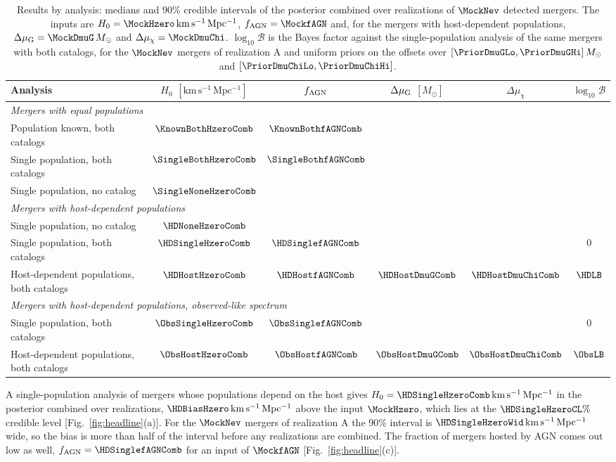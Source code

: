 \documentclass[aps,prd,reprint,superscriptaddress,nofootinbib,nolongbibliography,floatfix]{revtex4-2}
\newcommand{\kms}{\,\mathrm{km\,s^{-1}\,Mpc^{-1}}}
\newcommand{\Msun}{M_\odot}
\newcommand{\fagn}{f_{\rm AGN}}
\newcommand{\dmug}{\Delta\mu_{\rm G}}
\newcommand{\dmuchi}{\Delta\mu_{\chi}}
\newcommand{\lB}{\log_{10}\mathcal{B}}
\begin{document}
\begin{table}
\caption{Results by analysis: medians and 90\% credible intervals of the posterior combined over realizations of $\MockNev$ detected mergers.
The inputs are $H_0=\MockHzero\kms$, $\fagn=\MockfAGN$ and, for the mergers with host-dependent populations, $\dmug=\MockDmuG\,\Msun$ and $\dmuchi=\MockDmuChi$.
$\lB$ is the Bayes factor against the single-population analysis of the same mergers with both catalogs, for the $\MockNev$ mergers of realization A and uniform priors on the offsets over $[\PriorDmuGLo,\PriorDmuGHi]\,\Msun$ and $[\PriorDmuChiLo,\PriorDmuChiHi]$.}
\label{tab:results}
\begin{ruledtabular}
\begin{tabular}{lccccc}
Analysis & $H_0$ $[\mathrm{km\,s^{-1}\,Mpc^{-1}}]$ & $\fagn$ & $\dmug$ $[\Msun]$ & $\dmuchi$ & $\lB$\\
\hline
\multicolumn{6}{l}{\textit{Mergers with equal populations}}\\
Population known, both catalogs & $\KnownBothHzeroComb$ & $\KnownBothfAGNComb$ & & & \\
Single population, both catalogs & $\SingleBothHzeroComb$ & $\SingleBothfAGNComb$ & & & \\
Single population, no catalog & $\SingleNoneHzeroComb$ & & & & \\
\multicolumn{6}{l}{\textit{Mergers with host-dependent populations}}\\
Single population, no catalog & $\HDNoneHzeroComb$ & & & & \\
Single population, both catalogs & $\HDSingleHzeroComb$ & $\HDSinglefAGNComb$ & & & 0\\
Host-dependent populations, both catalogs & $\HDHostHzeroComb$ & $\HDHostfAGNComb$ & $\HDHostDmuGComb$ & $\HDHostDmuChiComb$ & $\HDLB$\\
\multicolumn{6}{l}{\textit{Mergers with host-dependent populations, observed-like spectrum}}\\
Single population, both catalogs & $\ObsSingleHzeroComb$ & $\ObsSinglefAGNComb$ & & & 0\\
Host-dependent populations, both catalogs & $\ObsHostHzeroComb$ & $\ObsHostfAGNComb$ & $\ObsHostDmuGComb$ & $\ObsHostDmuChiComb$ & $\ObsLB$\\
\end{tabular}
\end{ruledtabular}
\end{table}

A single-population analysis of mergers whose populations depend on the host gives $H_0=\HDSingleHzeroComb\kms$ in the posterior combined over realizations, $\HDBiasHzero\kms$ above the input $\MockHzero$, which lies at the $\HDSingleHzeroCL\%$ credible level [Fig.~\ref{fig:headline}(a)]. %
For the $\MockNev$ mergers of realization A the 90\% interval is $\HDSingleHzeroWid\kms$ wide, so the bias is more than half of the interval before any realizations are combined. %
The fraction of mergers hosted by AGN comes out low as well, $\fagn=\HDSinglefAGNComb$ for an input of $\MockfAGN$ [Fig.~\ref{fig:headline}(c)]. %
\end{document}
